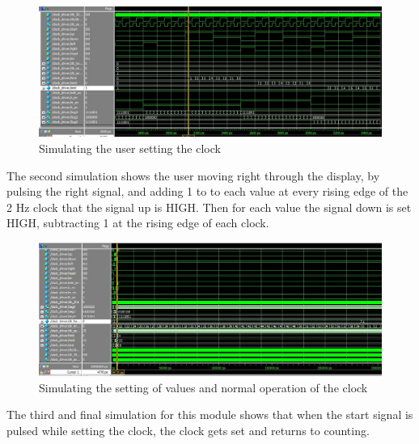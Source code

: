 \documentclass[a4paper]{article}
\begin{document}
\begin{figure}[H]
    \includegraphics[width=0.8 \linewidth]{images/clockdriversim2.JPG}
    \caption{Simulating the user setting the clock}
    \label{clockdriversim2}
\end{figure}
The second simulation shows the user moving right through the display, by pulsing the right signal, and adding 1 to to each value at every rising edge of the 2 Hz clock that the signal up is HIGH. Then for each value the signal down is set HIGH, subtracting 1 at the rising edge of each clock.

\begin{figure}[H]
    \includegraphics[width=0.8 \linewidth]{images/clockdriversim3.JPG}
    \caption{Simulating the setting of values and normal operation of the clock}
    \label{clockdriversim3}
\end{figure}
The third and final simulation for this module shows that when the start signal is pulsed while setting the clock, the clock gets set and returns to counting.
\end{document}
